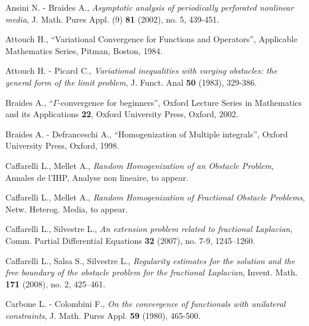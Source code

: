 \documentclass[10pt,reqno]{amsart}
\numberwithin{equation}{section}
\begin{document}




\begin{thebibliography}{99}


 {\rm Ansini N. - Braides A.},
{\it Asymptotic analysis of periodically perforated nonlinear media},
J. Math. Pures Appl. (9) {\bf 81}  (2002), no. 5, 439-451. 

 {\rm Attouch H.}, ``Variational Convergence for Functions and
Operators'', Applicable Mathematics Series, Pitman, Boston, 1984.

 {\rm Attouch H. - Picard C.},
{\it Variational inequalities with varying obstacles:
the general form of the limit problem}, J. Funct. Anal {\bf 50} (1983),
329-386.

 {\rm Braides A.}, ``$\Gamma$-convergence for beginners'',
Oxford Lecture Series in Mathematics and its Applications {\bf 22},
Oxford University Press, Oxford, 2002.

 {\rm Braides A. - Defranceschi A.},
``Homogenization of Multiple integrals'', Oxford University Press,
Oxford, 1998.

 {\rm Caffarelli L., Mellet A.},
{\it Random Homogenization of an Obstacle Problem},
Annales de l'IHP, Analyse non lineaire, to appear.

 {\rm Caffarelli L., Mellet A.},
{\it Random Homogenization of Fractional Obstacle Problems},
 Netw. Heterog. Media, to appear.

 {\rm Caffarelli L., Silvestre L.},
{\it An extension problem related to fractional Laplacian},
Comm. Partial Differential Equations {\bf 32} (2007), no. 7-9, 1245--1260.

 {\rm Caffarelli L., Salsa S., Silvestre L.},
{\it Regularity estimates for the solution and the free boundary of
the obstacle problem for the fractional Laplacian},
Invent. Math. {\bf 171} (2008),  no. 2, 425--461.

 {\rm Carbone L. - Colombini F.},
{\it On the convergence of functionals with unilateral constraints},
J. Math. Pures Appl. {\bf 59} (1980), 465-500.


\end{thebibliography}
\end{document}

